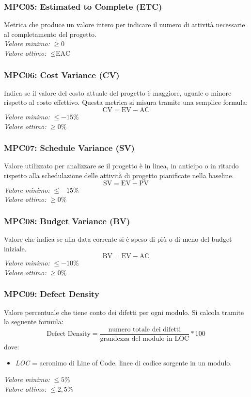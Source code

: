 \subsubsection{MPC05: Estimated to Complete (ETC)}
Metrica che produce un valore intero per indicare il numero di attività necessarie al completamento del progetto.\\
\textit{Valore minimo:} $\ge 0$\\
\textit{Valore ottimo:} $\le \text{EAC}$
\subsubsection{MPC06: Cost Variance (CV)}
Indica se il valore del costo attuale del progetto è maggiore, uguale o minore rispetto al costo effettivo.
Questa metrica si misura tramite una semplice formula:
\begin{equation*}
\text{CV}=\text{EV}-\text{AC}
\end{equation*}
\textit{Valore minimo:} $\le -15\%$\\
\textit{Valore ottimo:} $\ge 0\%$
\subsubsection{MPC07: Schedule Variance (SV)}
Valore utilizzato per analizzare se il progetto è in linea, in anticipo o in ritardo rispetto alla schedulazione delle attività di progetto pianificate nella baseline.
\begin{equation*}
\text{SV}=\text{EV}-\text{PV}
\end{equation*}
\textit{Valore minimo:} $\le -15\%$\\
\textit{Valore ottimo:} $\ge 0\%$
\subsubsection{MPC08: Budget Variance (BV)}
Valore che indica se alla data corrente si è speso di più o di meno del budget iniziale.
\begin{equation*}
\text{BV}=\text{EV}-\text{AC}
\end{equation*}
\textit{Valore minimo:} $\le -10\%$\\
\textit{Valore ottimo:} $\ge 0\%$

\subsubsection{MPC09: Defect Density}
Valore percentuale che tiene conto dei difetti per ogni modulo.
Si calcola tramite la seguente formula:\\
\begin{equation*}
\text{Defect Density}=\frac{\text{numero totale dei difetti}}{\text{grandezza del modulo in LOC}}*100
\end{equation*}
dove:
\begin{itemize}
\item \textit{LOC} = acronimo di Line of Code, linee di codice sorgente in un modulo.
\end{itemize}
\textit{Valore minimo:} $\le 5\%$\\
\textit{Valore ottimo:} $\le 2,5\%$

